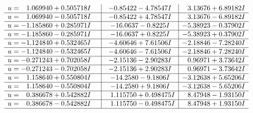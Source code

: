 \documentclass[1p]{elsarticle_modified}
\theoremstyle{definition}
\begin{document}
$$\begin{array}{c|c|c}
\begin{aligned}
u &= \phantom{-}1.069940 + 0.505718 I\end{aligned}
 & -0.85422 - 4.78547 I & \phantom{-}3.13676 + 6.89182 I \\ \hline\begin{aligned}
u &= \phantom{-}1.069940 - 0.505718 I\end{aligned}
 & -0.85422 + 4.78547 I & \phantom{-}3.13676 - 6.89182 I \\ \hline\begin{aligned}
u &= -1.185860 + 0.285971 I\end{aligned}
 & -16.0637 - 0.8225 I & -5.38923 - 0.37902 I \\ \hline\begin{aligned}
u &= -1.185860 - 0.285971 I\end{aligned}
 & -16.0637 + 0.8225 I & -5.38923 + 0.37902 I \\ \hline\begin{aligned}
u &= -1.124840 + 0.532465 I\end{aligned}
 & -4.60646 + 7.61506 I & -2.18846 - 7.28240 I \\ \hline\begin{aligned}
u &= -1.124840 - 0.532465 I\end{aligned}
 & -4.60646 - 7.61506 I & -2.18846 + 7.28240 I \\ \hline\begin{aligned}
u &= -0.271243 + 0.702058 I\end{aligned}
 & -2.15136 - 2.90283 I & \phantom{-}0.96971 + 3.73642 I \\ \hline\begin{aligned}
u &= -0.271243 - 0.702058 I\end{aligned}
 & -2.15136 + 2.90283 I & \phantom{-}0.96971 - 3.73642 I \\ \hline\begin{aligned}
u &= \phantom{-}1.158640 + 0.550804 I\end{aligned}
 & -14.2580 - 9.1806 I & -3.12638 + 5.65206 I \\ \hline\begin{aligned}
u &= \phantom{-}1.158640 - 0.550804 I\end{aligned}
 & -14.2580 + 9.1806 I & -3.12638 - 5.65206 I \\ \hline\begin{aligned}
u &= \phantom{-}0.386678 + 0.542882 I\end{aligned}
 & \phantom{-}1.115750 + 0.498475 I & \phantom{-}8.47948 - 1.93150 I \\ \hline\begin{aligned}
u &= \phantom{-}0.386678 - 0.542882 I\end{aligned}
 & \phantom{-}1.115750 - 0.498475 I & \phantom{-}8.47948 + 1.93150 I\\
 \hline 
 \end{array}$$\newpage
\end{document}
